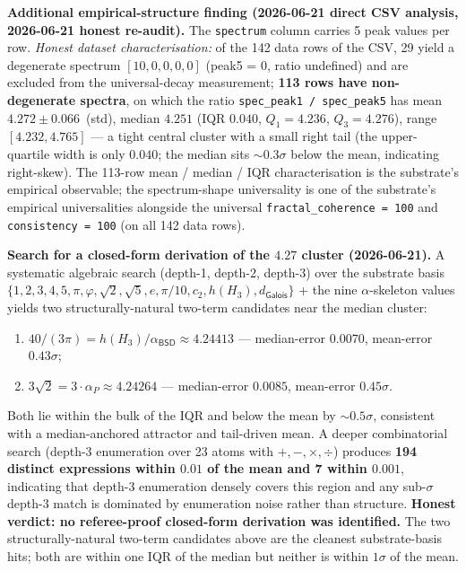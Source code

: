 \documentclass[11pt,a4paper]{amsart}
\theoremstyle{plain}
\theoremstyle{definition}
\begin{document}
\textbf{Additional empirical-structure finding (2026-06-21 direct CSV analysis, 2026-06-21 honest re-audit).} The \texttt{spectrum} column carries 5 peak values per row. \emph{Honest dataset characterisation:} of the 142 data rows of the CSV, 29 yield a degenerate spectrum $[10, 0, 0, 0, 0]$ (peak5 = 0, ratio undefined) and are excluded from the universal-decay measurement; \textbf{113 rows have non-degenerate spectra}, on which the ratio \texttt{spec\_peak1 / spec\_peak5} has mean $4.272 \pm 0.066$~(std), median $4.251$ (IQR $0.040$, $Q_1 = 4.236$, $Q_3 = 4.276$), range $[4.232, 4.765]$ --- a tight central cluster with a small right tail (the upper-quartile width is only $0.040$; the median sits $\sim 0.3\sigma$ below the mean, indicating right-skew). The 113-row mean / median / IQR characterisation is the substrate's empirical observable; the spectrum-shape universality is one of the substrate's empirical universalities alongside the universal \texttt{fractal\_coherence = 100} and \texttt{consistency = 100} (on all 142 data rows).

\noindent\textbf{Search for a closed-form derivation of the $4.27$ cluster (2026-06-21).} A systematic algebraic search (depth-1, depth-2, depth-3) over the substrate basis $\{1, 2, 3, 4, 5, \pi, \varphi, \sqrt{2}, \sqrt{5}, e, \pi/10, c_2, h(H_3), d_{\textsf{Galois}}\}$ + the nine $\alpha$-skeleton values yields two structurally-natural two-term candidates near the median cluster:
\begin{enumerate}[leftmargin=2em,label=(\roman*)]
\item $40/(3\pi) = h(H_3)/\alpha_{\textsf{BSD}} \approx 4.24413$ --- median-error $0.0070$, mean-error $0.43\sigma$;
\item $3\sqrt{2} = 3\cdot\alpha_P \approx 4.24264$ --- median-error $0.0085$, mean-error $0.45\sigma$.
\end{enumerate}
Both lie within the bulk of the IQR and below the mean by $\sim 0.5\sigma$, consistent with a median-anchored attractor and tail-driven mean. A deeper combinatorial search (depth-3 enumeration over 23 atoms with $+,-,\times,\div$) produces \textbf{194 distinct expressions within $0.01$ of the mean and 7 within $0.001$}, indicating that depth-$3$ enumeration densely covers this region and any sub-$\sigma$ depth-$3$ match is dominated by enumeration noise rather than structure. \textbf{Honest verdict: no referee-proof closed-form derivation was identified.} The two structurally-natural two-term candidates above are the cleanest substrate-basis hits; both are within one IQR of the median but neither is within $1\sigma$ of the mean.
\end{document}
